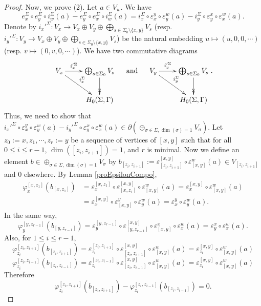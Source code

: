 \documentclass[a4paper,10pt]{amsart}
\begin{document}
\begin{proof}
	Now, we prove (2). Let $a \in V_w$. We have
	\[
		e_x^\Sigma \circ e_y^\Sigma \circ i_w^\Sigma(a) -e_y^\Sigma \circ e_x^\Sigma \circ i_w^\Sigma (a) = i_x^\Sigma \circ \varepsilon^y_x \circ  \varepsilon^w_y(a)-i_y^\Sigma \circ \varepsilon^x_y \circ  \varepsilon^w_x(a).
	\]
	Denote by $i_x'^\Sigma : V_x \to V_x \oplus V_y \oplus \bigoplus_{s \in \Sigma_0 \setminus \{x,y\}} V_s$ (resp. $i_y'^\Sigma : V_y \to V_x \oplus V_y \oplus \bigoplus_{s \in \Sigma_0 \setminus \{x,y\}} V_s$) be the natural embedding $u \mapsto (u,0,0,\cdots)$ (resp. $v \mapsto (0,v,0,\cdots)$). We have two commutative diagrams
	\begin{gather*}
		\xymatrix{
   		 V_x \ar[r]^-{i_x'^\Sigma} \ar[dr]^-{i_x^\Sigma} & \bigoplus_{s \in \Sigma_0 } V_s \ar@{->>}[d] \\
    	  & H_0(\Sigma,\Gamma)
  		} 
  		\quad \text{ and } \quad
  		\xymatrix{
   		 V_y \ar[r]^-{i_y'^\Sigma} \ar[dr]^-{i_y^\Sigma} & \bigoplus_{s \in \Sigma_0 } V_s \ar@{->>}[d] \\
    	  & H_0(\Sigma,\Gamma)
  		}.
	\end{gather*}
	Thus, we need to show that $i_x'^\Sigma \circ \varepsilon^y_x \circ  \varepsilon^w_y(a)-i_y'^\Sigma \circ \varepsilon^x_y \circ  \varepsilon^w_x(a) \in \partial(\oplus_{\sigma \in \Sigma, \dim(\sigma)=1}V_\sigma)$. Let $z_0:=x,z_1,\cdots,z_r:=y$ be a sequence of vertices of $[x,y]$ such that for all $0 \leq i \leq r-1$, $\dim([z_i,z_{i+1}])=1$, and $r$ is minimal. Now we define an element $b \in \oplus_{\sigma \in \Sigma, \dim(\sigma)=1}V_\sigma$ by $b_{[z_i,z_{i+1}]}:= \varepsilon^{[x,y]}_{[z_i,z_{i+1}]} \circ \varepsilon^{w}_{[x,y]} (a) \in V_{[z_i,z_{i+1}]}$ and 0 elsewhere. By Lemma \ref{proEpsilonCompo}, 
	\begin{align*}
		\varphi^{[x,z_1]}_x(b_{[x,z_1]}) &=\varepsilon^{[x,z_1]}_x  \circ  \varepsilon^{[x,y]}_{[x,z_{1}]} \circ \varepsilon^{w}_{[x,y]} (a) = \varepsilon^{[x,y]}_{x} \circ \varepsilon^{w}_{[x,y]} (a) \\
		&= \varepsilon^{[x,y]}_{x} \circ \varepsilon^{y}_{[x,y]} \circ \varepsilon^{w}_{y} (a) = \varepsilon^{y}_{x} \circ \varepsilon^{w}_{y} (a).
	\end{align*}
	In the same way,
	\[
		\varphi^{[y,z_{r-1}]}_y(b_{[y,z_{r-1}]}) =\varepsilon^{[y,z_{r-1}]}_y  \circ  \varepsilon^{[x,y]}_{[y,z_{r-1}]} \circ \varepsilon^{x}_{[x,y]} \circ \varepsilon^{w}_{x} (a)   = \varepsilon^{x}_{y} \circ \varepsilon^{w}_{x} (a).
	\]
	Also, for $1 \leq i \leq r-1$,
	\[
	 	\varphi^{[z_i,z_{i+1}]}_{z_i}(b_{[z_i,z_{i+1}]}) = \varepsilon^{[z_i,z_{i+1}]}_{z_i} \circ \varepsilon^{[x,y]}_{[z_i,z_{i+1}]} \circ \varepsilon^{w}_{[x,y]} (a) = \varepsilon^{[x,y]}_{z_i} \circ \varepsilon^{w}_{[x,y]} (a)
	 \]
	 \[
	 	\varphi^{[z_i,z_{i-1}]}_{z_{i}}(b_{[z_i,z_{i-1}]}) = \varepsilon^{[z_i,z_{i-1}]}_{z_{i}} \circ \varepsilon^{[x,y]}_{[z_i,z_{i-1}]} \circ \varepsilon^{w}_{[x,y]} (a) = \varepsilon^{[x,y]}_{z_{i}} \circ \varepsilon^{w}_{[x,y]} (a)
	 \]
	 Therefore 
	 \[
	 	\varphi^{[z_i,z_{i+1}]}_{z_i}(b_{[z_i,z_{i+1}]}) - \varphi^{[z_i,z_{i-1}]}_{z_{i}}(b_{[z_i,z_{i-1}]}) = 0.
	 \]
	


\end{proof}
\end{document}
